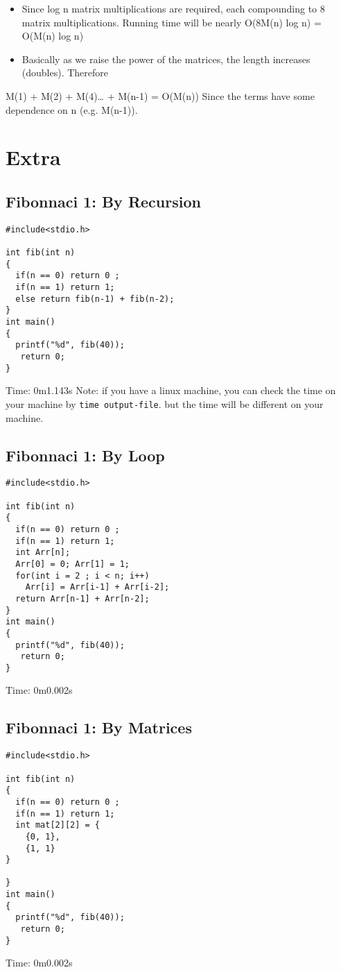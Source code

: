 \documentclass{book}
\begin{document}
\begin{itemize}
\item Since log n matrix multiplications are required, each compounding to 8 matrix multiplications. Running time will be nearly O(8M(n) log n) = O(M(n) log n)
\item Basically as we raise the power of the matrices, the length increases (doubles). Therefore
\end{itemize}
M(1) + M(2) + M(4)\ldots{} + M(n-1) = O(M(n))
Since the terms have some dependence on n (e.g. M(n-1)). 

\section{Extra}
\label{sec:org5bd58eb}


\subsection{Fibonnaci 1: By Recursion}
\label{sec:org6e3611d}
\begin{verbatim}
#include<stdio.h>

int fib(int n)
{
  if(n == 0) return 0 ;
  if(n == 1) return 1;
  else return fib(n-1) + fib(n-2);  
}
int main()
{
  printf("%d", fib(40));
   return 0;
}
\end{verbatim}
Time: 0m1.143s
Note: if you have a linux machine, you can check the time on your machine by \texttt{time output-file}. but the time will be different on your machine.
\subsection{Fibonnaci 1: By Loop}
\label{sec:org195080d}
\begin{verbatim}
#include<stdio.h>

int fib(int n)
{
  if(n == 0) return 0 ;
  if(n == 1) return 1;
  int Arr[n];
  Arr[0] = 0; Arr[1] = 1;
  for(int i = 2 ; i < n; i++)
    Arr[i] = Arr[i-1] + Arr[i-2];
  return Arr[n-1] + Arr[n-2];
}
int main()
{
  printf("%d", fib(40));
   return 0;
}
\end{verbatim}
Time: 0m0.002s
\subsection{Fibonnaci 1: By Matrices}
\label{sec:org2bfd395}
\begin{verbatim}
#include<stdio.h>

int fib(int n)
{
  if(n == 0) return 0 ;
  if(n == 1) return 1;
  int mat[2][2] = {
    {0, 1},
    {1, 1}
}

}
int main()
{
  printf("%d", fib(40));
   return 0;
}
\end{verbatim}
Time: 0m0.002s
\mainmatter
\end{document}
